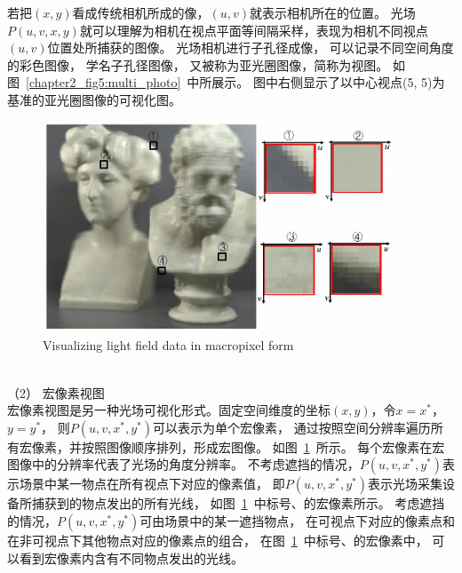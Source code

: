 若把$(x,y)$看成传统相机所成的像，$(u, v)$就表示相机所在的位置。
光场$P(u, v, x, y)$就可以理解为相机在视点平面等间隔采样，表现为相机不同视点$(u, v)$位置处所捕获的图像。
光场相机进行子孔径成像，
可以记录不同空间角度的彩色图像，
学名子孔径图像，
又被称为亚光圈图像，简称为视图。
如图~\ref{chapter2_fig5:multi_photo}~中所展示。
图中右侧显示了以中心视点(5, 5)为基准的亚光圈图像的可视化图。
%
%
%
%
\begin{figure}[t]
	\centering
	\includegraphics[width=0.73\linewidth]{figures/chapter2/macro_photo}
	{Visualizing light field data in macropixel form}  
	\label{cpt2_fig5:macro_photo}
\end{figure}
%
%
%
%
\\
%
%
%
%
\indent
（2）
宏像素视图
\\
%
%
%
%
\indent
宏像素视图是另一种光场可视化形式。固定空间维度的坐标$(x, y)$，令$x=x^{*}$，$y=y^{*}$，
则$ P(u, v, x^{*}, y^{*})$可以表示为单个宏像素，
通过按照空间分辨率遍历所有宏像素，并按照图像顺序排列，形成宏图像。
如图~\ref{cpt2_fig5:macro_photo}~所示。
每个宏像素在宏图像中的分辨率代表了光场的角度分辨率。
%
不考虑遮挡的情况，$ P(u, v, x^{*}, y^{*})$表示场景中某一物点在所有视点下对应的像素值，
即$ P(u, v, x^{*}, y^{*})$表示光场采集设备所捕获到的物点发出的所有光线，
如图~\ref{cpt2_fig5:macro_photo}~中标号、的宏像素所示。
考虑遮挡的情况，$ P(u, v, x^{*}, y^{*})$可由场景中的某一遮挡物点，
在可视点下对应的像素点和在非可视点下其他物点对应的像素点的组合，
在图~\ref{cpt2_fig5:macro_photo}~中标号、的宏像素中，
可以看到宏像素内含有不同物点发出的光线。
%
%
%
%
%
